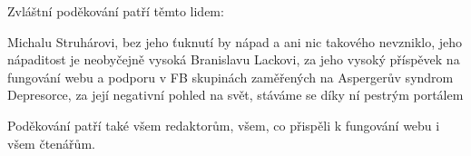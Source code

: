 \documentclass[DIV=calc, paper=a4, fontsize=11pt, twocolumn]{scrartcl}	 %
\begin{document}
Zvláštní poděkování patří těmto lidem:

    Michalu Struhárovi, bez jeho ťuknutí by nápad a ani nic takového
    nevzniklo, jeho nápaditost je neobyčejně vysoká
    Branislavu Lackovi, za jeho vysoký příspěvek na fungování webu a
    podporu v FB skupinách zaměřených na Aspergerův syndrom
    Depresorce, za její negativní pohled na svět, stáváme se díky ní
    pestrým portálem

Poděkování patří také všem redaktorům, všem, co přispěli k fungování
webu i všem čtenářům.




 

\end{document}
